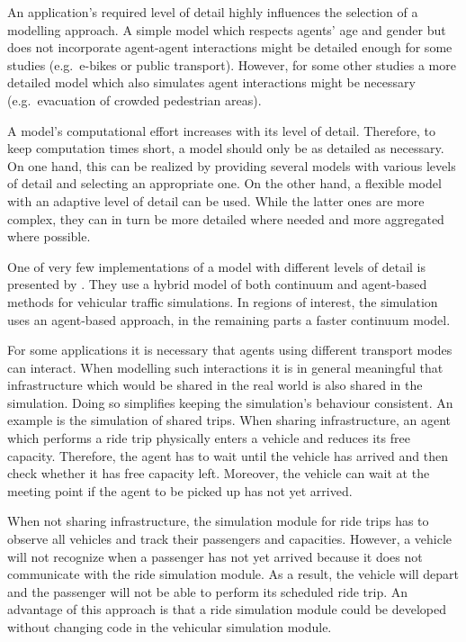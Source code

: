 An application's required level of detail highly influences the selection of a modelling approach. A simple model which respects agents' age and gender but does not incorporate agent-agent interactions might be detailed enough for some studies (e.g.~e-bikes or public transport). However, for some other studies a more detailed model which also simulates agent interactions might be necessary (e.g.~evacuation of crowded pedestrian areas).

A model's computational effort increases with its level of detail. Therefore, to keep computation times short, a model should only be as detailed as necessary. On one hand, this can be realized by providing several models with various levels of detail and selecting an appropriate one. On the other hand, a flexible model with an adaptive level of detail can be used. While the latter ones are more complex, they can in turn  be more detailed where needed and more aggregated where possible.

One of very few implementations of a model with different levels of detail is presented by \citet{SewallJEtAl_ACMTG_2011}. They use a hybrid model of both continuum and agent-based methods for vehicular traffic simulations. In regions of interest, the simulation uses an agent-based approach, in the remaining parts a faster continuum model.

For some applications it is necessary that agents using different transport modes can interact. When modelling such interactions it is in general meaningful that infrastructure which would be shared in the real world is also shared in the simulation. Doing so simplifies keeping the simulation's behaviour consistent. An example is the simulation of shared trips. When sharing infrastructure, an agent which performs a ride trip physically enters a vehicle and reduces its free capacity. Therefore, the agent has to wait until the vehicle has arrived and then check whether it has free capacity left. Moreover, the vehicle can wait at the meeting point if the agent to be picked up has not yet arrived.

When not sharing infrastructure, the simulation module for ride trips has to observe all vehicles and track their passengers and capacities. However, a vehicle will not recognize when a passenger has not yet arrived because it does not communicate with the ride simulation module. As a result, the vehicle will depart and the passenger will not be able to perform its scheduled ride trip. An advantage of this approach is that a ride simulation module could be developed without changing code in the vehicular simulation module.

